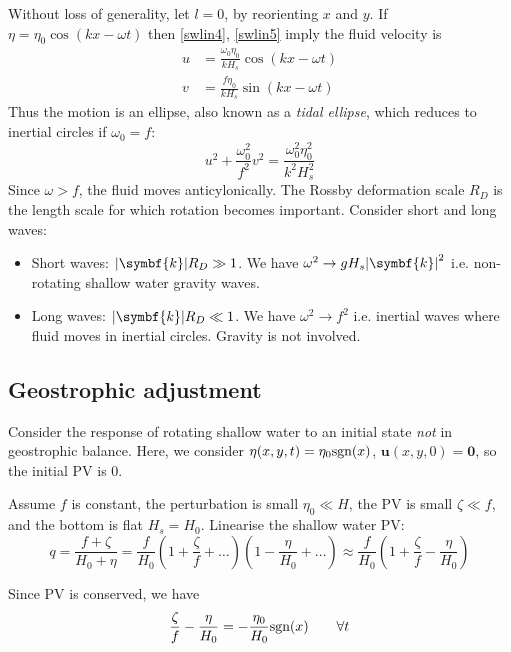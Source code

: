\documentclass{jknotes}
\begin{document}
Without loss of generality, let $l = 0$, by reorienting $x$ and $y$. If $\eta
= \eta_0 \cos(kx-\omega t)$ then \eqref{swlin4}, \eqref{swlin5} imply the
fluid velocity is
\begin{align}
	u &= \frac{\omega_0 \eta_0}{k H_s} \cos(kx-\omega t) \\
	v &= \frac{f \eta_0}{k H_s} \sin(kx-\omega t)
\end{align}
Thus the motion is an ellipse, also known as a \emph{tidal ellipse}, which
reduces to inertial circles if $\omega_0 = f$:
\begin{equation}
	u^2 + \frac{\omega_0^2}{f^2} v^2 = \frac{\omega_0^2 \eta_0^2}{k^2 H_s^2}
\end{equation}
Since $\omega > f$, the fluid moves anticylonically. The Rossby deformation
scale $R_D$ is the length scale for which rotation becomes important. Consider
short and long waves:
\begin{itemize}
	\item Short waves: $\abs{\symbf{k}} R_D \gg 1$. We have $\omega^2 \to g H_s
		\abs{\symbf{k}}^2$ i.e. non-rotating shallow water gravity waves.
	\item Long waves: $\abs{\symbf{k}}R_D \ll 1$. We have $\omega^2 \to f^2$ i.e.
		inertial waves where fluid moves in inertial circles. Gravity is not
		involved.
\end{itemize}

\subsection{Geostrophic adjustment}
Consider the response of rotating shallow water to an initial state \emph{not}
in geostrophic balance. Here, we consider $\eta(x,y,t) = \eta_0 \text{sgn}(x)$,
$\symbf{u}(x,y,0) = \symbf{0}$, so the initial PV is $0$. 


Assume $f$ is constant, the perturbation is small $\eta_0 \ll H$, the PV is
small $\zeta \ll f$, and the bottom is flat $H_s = H_0$. Linearise the shallow
water PV:
\begin{equation}
	q = \frac{f+\zeta}{H_0+\eta} = \frac{f}{H_0}\left(1+\frac{\zeta}{f} +
		\dots\right)\left(1-\frac{\eta}{H_0}+\dots\right) \approx
		\frac{f}{H_0}\left(1+\frac{\zeta}{f} - \frac{\eta}{H_0}\right)
\end{equation}

Since PV is conserved, we have
\begin{equation}
	\frac{\zeta}{f} - \frac{\eta}{H_0} = -\frac{\eta_0}{H_0} \text{sgn}(x)
	\hspace{2em} \forall t \label{eq:PVcons}
\end{equation}
\end{document}
